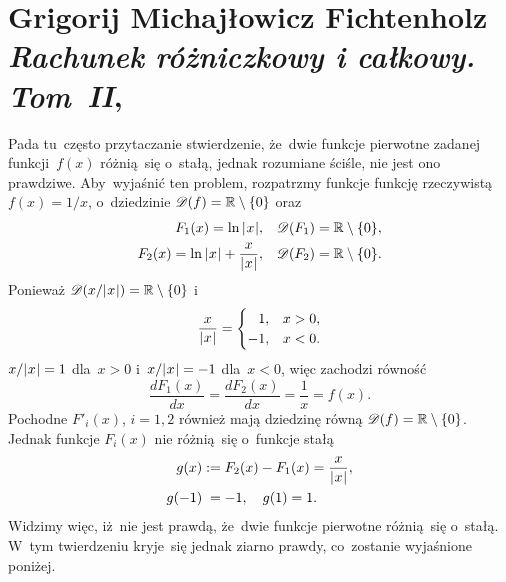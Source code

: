 \documentclass[a4paper,11pt]{article}
\numberwithin{equation}{section}
\begin{document}
\section{Grigorij Michajłowicz Fichtenholz \\
  \textit{Rachunek różniczkowy i całkowy. Tom~II},
  \parencite{Fichtenholz-Rachunek-rozniczkowy-ETC-Vol-II-Pub-2004}}

\vspace{0em}



\vspace{0em}


\noindent
{} Pada tu~często przytaczanie stwierdzenie, że~dwie
funkcje pierwotne zadanej funkcji~$f( x )$ różnią~się o~stałą, jednak
rozumiane ściśle, nie jest ono prawdziwe. Aby~wyjaśnić ten problem,
rozpatrzmy funkcje funkcję rzeczywistą $f( x ) = 1 / x$, o~dziedzinie
$\mathcal{D}( f ) = \mathbb{R} \setminus \{ 0 \}$ oraz
\begin{subequations}
  \begin{align}
    \label{eq:FichtenholzVolII-01-A}
    F_{ 1 }( x ) = \ln| \hspace{0.05em}  x  \hspace{0.05em} |, \quad
    & \mathcal{D}( F_{ 1 } ) = \mathbb{R} \setminus \{ 0 \}, \\
    \label{eq:FichtenholzVolII-01-B}
    F_{ 2 }( x ) = \ln| \hspace{0.05em}  x  \hspace{0.05em} | + \frac{ x }{ | \hspace{0.05em}  x  \hspace{0.05em} | }, \quad
    & \mathcal{D}( F_{ 2 } ) = \mathbb{R} \setminus \{ 0 \}.
  \end{align}
\end{subequations}
Ponieważ $\mathcal{D}( x / | \hspace{0.05em}  x  \hspace{0.05em} | ) = \mathbb{R} \setminus \{ 0 \}$ i
\begin{equation}
  \label{eq:FichtenholzVolII-02}
  \frac{ x }{ | \hspace{0.05em}  x  \hspace{0.05em} | } =
  \begin{cases}
    \hphantom{-}1, & x > 0, \\
    -1, & x < 0.
  \end{cases}
\end{equation}
$x / | \hspace{0.05em}  x  \hspace{0.05em} | = 1$ dla~$x > 0$ i~$x / | \hspace{0.05em}  x  \hspace{0.05em} | = -1$
dla~$x < 0$, więc zachodzi równość
\begin{equation}
  \label{eq:FichtenholzVolII-03}
  \frac{ d F_{ 1 }( x ) }{ dx } = \frac{ d F_{ 2 }( x ) }{ dx }
  = \frac{ 1 }{ x } = f( x ).
\end{equation}
Pochodne $F'_{ i }( x )$, $i = 1, 2$ również mają dziedzinę równą
$\mathcal{D}( f ) = \mathbb{R} \setminus \{ 0 \}$. Jednak funkcje $F_{ i }( x )$
nie różnią~się o~funkcje stałą
\begin{subequations}
  \begin{align}
    \label{eq:FichtenholzVolII-04-A}
    g( x ) &:= F_{ 2 }( x ) - F_{ 1 }( x ) = \frac{ x }{ | \hspace{0.05em}  x  \hspace{0.05em} | }, \\
    \label{eq:FichtenholzVolII-04-B}
    g( -1 ) &\hphantom{:}= -1, \quad g( 1 ) = 1.
  \end{align}
\end{subequations}
Widzimy więc, iż~nie jest prawdą, że~dwie funkcje pierwotne różnią~się
o~stałą. W~tym twierdzeniu kryje~się jednak ziarno prawdy, co~zostanie
wyjaśnione poniżej.
\end{document}
